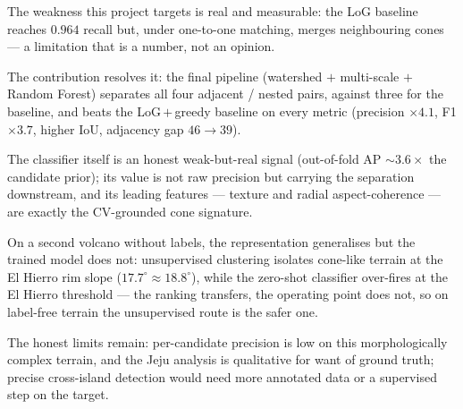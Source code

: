 \documentclass[11pt]{article}
\begin{document}
The weakness this project targets is real and measurable: the LoG baseline reaches $0.964$ recall but, under one-to-one matching, merges neighbouring cones --- a limitation that is a number, not an opinion.

The contribution resolves it: the final pipeline (watershed $+$ multi-scale $+$ Random Forest) separates all four adjacent / nested pairs, against three for the baseline, and beats the LoG\,$+$\,greedy baseline on every metric (precision $\times 4.1$, F1 $\times 3.7$, higher IoU, adjacency gap $46\to39$).

The classifier itself is an honest weak-but-real signal (out-of-fold AP $\sim 3.6\times$ the candidate prior); its value is not raw precision but carrying the separation downstream, and its leading features --- texture and radial aspect-coherence --- are exactly the CV-grounded cone signature.

On a second volcano without labels, the representation generalises but the trained model does not: unsupervised clustering isolates cone-like terrain at the El Hierro rim slope ($17.7^\circ \approx 18.8^\circ$), while the zero-shot classifier over-fires at the El Hierro threshold --- the ranking transfers, the operating point does not, so on label-free terrain the unsupervised route is the safer one.

The honest limits remain: per-candidate precision is low on this morphologically complex terrain, and the Jeju analysis is qualitative for want of ground truth; precise cross-island detection would need more annotated data or a supervised step on the target.
\end{document}
